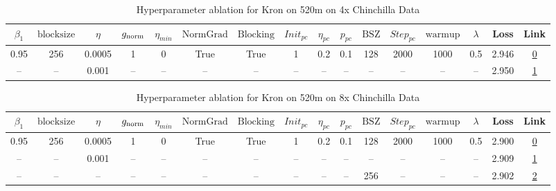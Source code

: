 \begin{table}[H]
\centering
\caption{Hyperparameter ablation for Kron on 520m on 4x Chinchilla Data}
\label{tab:ablation_kron_520m_on_4x_chinchilla_data}
\begin{tabular}{cccccccccccccccc}
\toprule
$\beta_1$ & $\mathrm{block size}$ & $\eta$ & $g_{\mathrm{norm}}$ & $\eta_{min}$ & $\mathrm{NormGrad}$ & $\mathrm{Blocking}$ & $Init_{pc}$ & $\eta_{pc}$ & $p_{pc}$ & $\mathrm{BSZ}$ & $Step_{pc}$ & $\mathrm{warmup}$ & $\lambda$ & Loss & Link \\
\midrule
0.95 & 256 & 0.0005 & 1 & 0 & True & True & 1 & 0.2 & 0.1 & 128 & 2000 & 1000 & 0.5 & 2.946 & \href{https://wandb.ai/marin-community/optimizer-scaling/runs/sweep-520m-42B-kronf21245lr0.0005-wd0.5-b10.95-plr0.2-pis1-gn1-n-e5e732}{0} \\
\midrule
-- & -- & 0.001 & -- & -- & -- & -- & -- & -- & -- & -- & -- & -- & -- & 2.950 & \href{https://wandb.ai/marin-community/optimizer-scaling/runs/sweep-520m-42B-kron644022lr0.001-wd0.5-b10.95-plr0.2-pis1-gn1-no-bbd127}{1} \\
\bottomrule
\end{tabular}
\end{table}

\begin{table}[H]
\centering
\caption{Hyperparameter ablation for Kron on 520m on 8x Chinchilla Data}
\label{tab:ablation_kron_520m_on_8x_chinchilla_data}
\begin{tabular}{cccccccccccccccc}
\toprule
$\beta_1$ & $\mathrm{block size}$ & $\eta$ & $g_{\mathrm{norm}}$ & $\eta_{min}$ & $\mathrm{NormGrad}$ & $\mathrm{Blocking}$ & $Init_{pc}$ & $\eta_{pc}$ & $p_{pc}$ & $\mathrm{BSZ}$ & $Step_{pc}$ & $\mathrm{warmup}$ & $\lambda$ & Loss & Link \\
\midrule
0.95 & 256 & 0.0005 & 1 & 0 & True & True & 1 & 0.2 & 0.1 & 128 & 2000 & 1000 & 0.5 & 2.900 & \href{https://wandb.ai/marin-community/optimizer-scaling/runs/sweep-520m-85B-kronc2a9f5lr0.0005-wd0.5-b10.95-plr0.2-pis1-gn1-n-7f654e}{0} \\
\midrule
-- & -- & 0.001 & -- & -- & -- & -- & -- & -- & -- & -- & -- & -- & -- & 2.909 & \href{https://wandb.ai/marin-community/optimizer-scaling/runs/sweep-520m-85B-kronea1c73lr0.001-wd0.5-b10.95-plr0.2-pis1-gn1-no-82b169}{1} \\
-- & -- & -- & -- & -- & -- & -- & -- & -- & -- & 256 & -- & -- & -- & 2.902 & \href{https://wandb.ai/marin-community/optimizer-scaling/runs/sweep-520m-85B-kronf21245lr0.0005-wd0.5-b10.95-plr0.2-pis1-gn1-n-6bceac}{2} \\
\bottomrule
\end{tabular}
\end{table}

